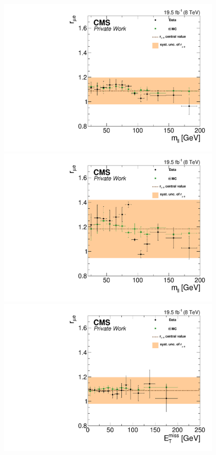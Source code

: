 \begin{figure}[htbp]
\centering
\begin{minipage}[t]{0.49\textwidth}
  \includegraphics[width=\textwidth]{plots/BG/rmue/rMuE_ZPeakControlCentral_Full2012_Mll_None.pdf}
\end{minipage}
\begin{minipage}[t]{0.49\textwidth}
\includegraphics[width=\textwidth]{plots/BG/rmue/rMuE_ZPeakControlForward_Full2012_Mll_None.pdf}
\end{minipage}
\begin{minipage}[t]{0.49\textwidth}
  \includegraphics[width=\textwidth]{plots/BG/rmue/rMuE_ZPeakControlCentral_Full2012_MET_None.pdf}

\end{minipage}
\end{figure}
